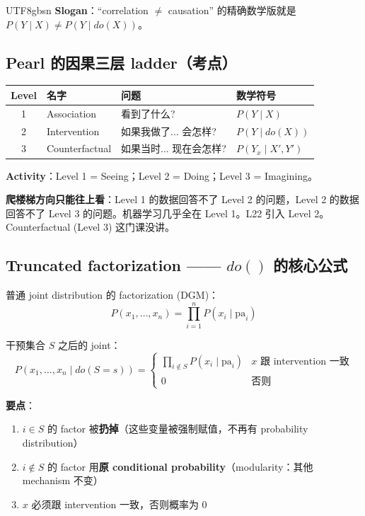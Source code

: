 \documentclass[11pt]{article}
\begin{document}
\begin{CJK}{UTF8}{gbsn}
\textbf{Slogan}：``correlation $\neq$ causation'' 的精确数学版就是 $P(Y \mid X) \neq P(Y \mid do(X))$。

\subsection{Pearl 的因果三层 ladder（考点）}

\begin{center}
\begin{tabular}{|c|l|l|l|}
\hline
Level & 名字 & 问题 & 数学符号 \\
\hline
1 & Association & 看到了什么? & $P(Y \mid X)$ \\
2 & Intervention & 如果我做了... 会怎样? & $P(Y \mid do(X))$ \\
3 & Counterfactual & 如果当时... 现在会怎样? & $P(Y_x \mid X', Y')$ \\
\hline
\end{tabular}
\end{center}

\textbf{Activity}：Level 1 = Seeing；Level 2 = Doing；Level 3 = Imagining。

\textbf{爬楼梯方向只能往上看}：Level 1 的数据回答不了 Level 2 的问题，Level 2 的数据回答不了 Level 3 的问题。机器学习几乎全在 Level 1。L22 引入 Level 2。Counterfactual (Level 3) 这门课没讲。

\subsection{Truncated factorization —— $do()$ 的核心公式}

普通 joint distribution 的 factorization (DGM)：
\[
P(x_1, \ldots, x_n) = \prod_{i=1}^n P(x_i \mid \text{pa}_i)
\]

干预集合 $S$ 之后的 joint：
\[
P(x_1, \ldots, x_n \mid do(S = s)) = \begin{cases} \prod_{i \notin S} P(x_i \mid \text{pa}_i) & x \text{ 跟 intervention 一致} \\ 0 & \text{否则} \end{cases}
\]

\textbf{要点}：
\begin{enumerate}[nosep]
  \item $i \in S$ 的 factor 被\textbf{扔掉}（这些变量被强制赋值，不再有 probability distribution）
  \item $i \notin S$ 的 factor 用\textbf{原 conditional probability}（modularity：其他 mechanism 不变）
  \item $x$ 必须跟 intervention 一致，否则概率为 0
\end{enumerate}


\end{CJK}
\end{document}
